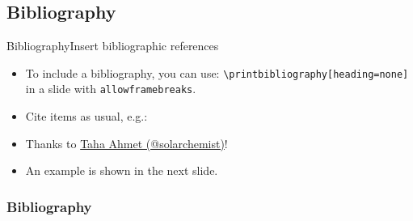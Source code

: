 \documentclass[10pt,aspectratio=43
	]{beamer}
\begin{document}
\subsection{Bibliography}
\begin{frame}{Bibliography}{Insert bibliographic references}
	\begin{itemize}
	    \item To include a bibliography, you can use: \texttt{\tt\textbackslash printbibliography[heading=none]} in a slide with \texttt{allowframebreaks}.
        \item Cite items as usual, e.g.: \cite{dijkstra1972humbleprogrammer, lamport1982proving} \nocite{*}
        \item Thanks to \href{https://github.com/luistar/unina-beamer/issues/1}{Taha Ahmet (@solarchemist)}!
        \item An example is shown in the next slide.
	\end{itemize}
\end{frame}

\begin{frame}[t,allowframebreaks]
   \frametitle{Bibliography}
   \printbibliography[heading=none]
\end{frame}

\begin{frame}
\end{frame}
\end{document}
